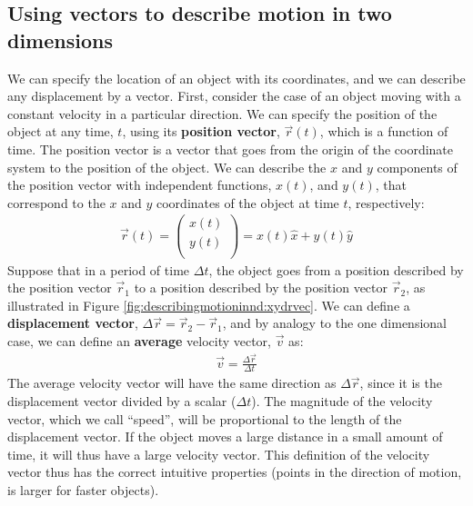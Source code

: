 \subsection{Using vectors to describe motion in two dimensions}
We can specify the location of an object with its coordinates, and we can describe any displacement by a vector. First, consider the case of an object moving with a constant velocity in a particular direction.  We can specify the position of the object at any time, $t$, using its \textbf{position vector}, $\vec r(t)$, which is a function of time. The position vector is a vector that goes from the origin of the coordinate system to the position of the object. We can describe the $x$ and $y$ components of the position vector with independent functions, $x(t)$, and $y(t)$, that correspond to the $x$ and $y$ coordinates of the object at time $t$, respectively:
\begin{align*}
\vec r(t) = \begin{pmatrix}
           x(t) \\
           y(t) \\
         \end{pmatrix}= x(t) \hat x + y(t) \hat y
\end{align*}
Suppose that in a period of time $\Delta t$, the object goes from a position described by the position vector $\vec r_1$ to a position described by the position vector $\vec r_2$, as illustrated in Figure \ref{fig:describingmotioninnd:xydrvec}.
We can define a \textbf{displacement vector}, $\Delta \vec r=\vec r_2-\vec r_1$, and by analogy to the one dimensional case, we can define an \textbf{average} velocity vector, $\vec v$ as:
\begin{align}
\vec v = \frac{\Delta \vec r}{\Delta t}
\end{align}
The average velocity vector will have the same direction as $\Delta \vec r$, since it is the displacement vector divided by a scalar ($\Delta t$). The magnitude of the velocity vector, which we call ``speed'', will be proportional to the length of the displacement vector. If the object moves a large distance in a small amount of time, it will thus have a large velocity vector. This definition of the velocity vector thus has the correct intuitive properties (points in the direction of motion, is larger for faster objects).

